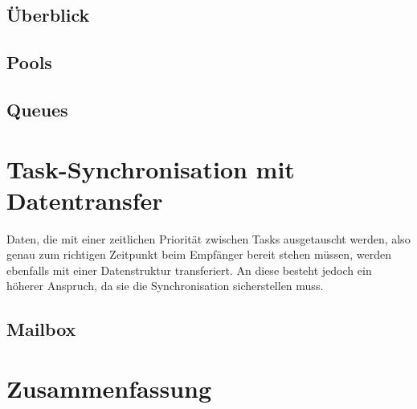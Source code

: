 \documentclass{llncs}
\begin{document}
\subsection{Überblick}
\subsection{Pools}
\subsection{Queues}
\section{Task-Synchronisation mit Datentransfer}
Daten, die mit einer zeitlichen Priorität zwischen Tasks ausgetauscht werden, also genau zum richtigen Zeitpunkt beim Empfänger bereit stehen müssen, werden ebenfalls mit einer Datenstruktur transferiert. An diese besteht jedoch ein höherer Anspruch, da sie die Synchronisation sicherstellen muss.
\subsection{Mailbox}
\section{Zusammenfassung}

\printbibliography
\end{document}
